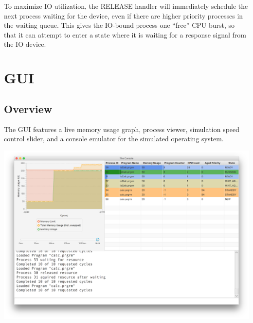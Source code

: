 \documentclass[paper=a4, fontsize=11pt]{scrartcl} %
\numberwithin{equation}{section} %
\numberwithin{figure}{section} %
\numberwithin{table}{section} %
\begin{document}
To maximize IO utilization, the RELEASE handler will immediately schedule the next process waiting for the device, even if there are higher priority processes in the waiting queue. This gives the IO-bound process one ``free'' CPU burst, so that it can attempt to enter a state where it is waiting for a response signal from the IO device.

\section{GUI}

\subsection{Overview}
The GUI features a live memory usage graph, process viewer, simulation speed control slider, and a console emulator for the simulated operating system. 

\includegraphics[width=\textwidth]{Demo.png} 
\end{document}
